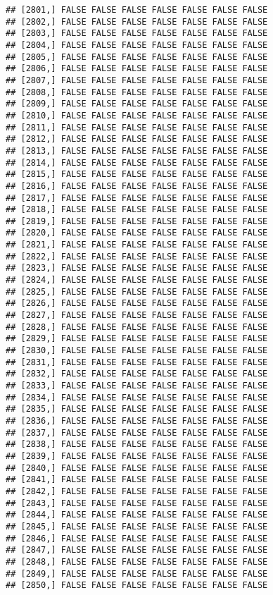 \documentclass[
]{article}
\begin{document}
\begin{verbatim}
## [2801,] FALSE FALSE FALSE FALSE FALSE FALSE FALSE
## [2802,] FALSE FALSE FALSE FALSE FALSE FALSE FALSE
## [2803,] FALSE FALSE FALSE FALSE FALSE FALSE FALSE
## [2804,] FALSE FALSE FALSE FALSE FALSE FALSE FALSE
## [2805,] FALSE FALSE FALSE FALSE FALSE FALSE FALSE
## [2806,] FALSE FALSE FALSE FALSE FALSE FALSE FALSE
## [2807,] FALSE FALSE FALSE FALSE FALSE FALSE FALSE
## [2808,] FALSE FALSE FALSE FALSE FALSE FALSE FALSE
## [2809,] FALSE FALSE FALSE FALSE FALSE FALSE FALSE
## [2810,] FALSE FALSE FALSE FALSE FALSE FALSE FALSE
## [2811,] FALSE FALSE FALSE FALSE FALSE FALSE FALSE
## [2812,] FALSE FALSE FALSE FALSE FALSE FALSE FALSE
## [2813,] FALSE FALSE FALSE FALSE FALSE FALSE FALSE
## [2814,] FALSE FALSE FALSE FALSE FALSE FALSE FALSE
## [2815,] FALSE FALSE FALSE FALSE FALSE FALSE FALSE
## [2816,] FALSE FALSE FALSE FALSE FALSE FALSE FALSE
## [2817,] FALSE FALSE FALSE FALSE FALSE FALSE FALSE
## [2818,] FALSE FALSE FALSE FALSE FALSE FALSE FALSE
## [2819,] FALSE FALSE FALSE FALSE FALSE FALSE FALSE
## [2820,] FALSE FALSE FALSE FALSE FALSE FALSE FALSE
## [2821,] FALSE FALSE FALSE FALSE FALSE FALSE FALSE
## [2822,] FALSE FALSE FALSE FALSE FALSE FALSE FALSE
## [2823,] FALSE FALSE FALSE FALSE FALSE FALSE FALSE
## [2824,] FALSE FALSE FALSE FALSE FALSE FALSE FALSE
## [2825,] FALSE FALSE FALSE FALSE FALSE FALSE FALSE
## [2826,] FALSE FALSE FALSE FALSE FALSE FALSE FALSE
## [2827,] FALSE FALSE FALSE FALSE FALSE FALSE FALSE
## [2828,] FALSE FALSE FALSE FALSE FALSE FALSE FALSE
## [2829,] FALSE FALSE FALSE FALSE FALSE FALSE FALSE
## [2830,] FALSE FALSE FALSE FALSE FALSE FALSE FALSE
## [2831,] FALSE FALSE FALSE FALSE FALSE FALSE FALSE
## [2832,] FALSE FALSE FALSE FALSE FALSE FALSE FALSE
## [2833,] FALSE FALSE FALSE FALSE FALSE FALSE FALSE
## [2834,] FALSE FALSE FALSE FALSE FALSE FALSE FALSE
## [2835,] FALSE FALSE FALSE FALSE FALSE FALSE FALSE
## [2836,] FALSE FALSE FALSE FALSE FALSE FALSE FALSE
## [2837,] FALSE FALSE FALSE FALSE FALSE FALSE FALSE
## [2838,] FALSE FALSE FALSE FALSE FALSE FALSE FALSE
## [2839,] FALSE FALSE FALSE FALSE FALSE FALSE FALSE
## [2840,] FALSE FALSE FALSE FALSE FALSE FALSE FALSE
## [2841,] FALSE FALSE FALSE FALSE FALSE FALSE FALSE
## [2842,] FALSE FALSE FALSE FALSE FALSE FALSE FALSE
## [2843,] FALSE FALSE FALSE FALSE FALSE FALSE FALSE
## [2844,] FALSE FALSE FALSE FALSE FALSE FALSE FALSE
## [2845,] FALSE FALSE FALSE FALSE FALSE FALSE FALSE
## [2846,] FALSE FALSE FALSE FALSE FALSE FALSE FALSE
## [2847,] FALSE FALSE FALSE FALSE FALSE FALSE FALSE
## [2848,] FALSE FALSE FALSE FALSE FALSE FALSE FALSE
## [2849,] FALSE FALSE FALSE FALSE FALSE FALSE FALSE
## [2850,] FALSE FALSE FALSE FALSE FALSE FALSE FALSE

\end{verbatim}
\end{document}
